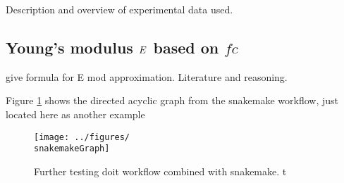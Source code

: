 Description and overview of experimental data used.

\subsection{Young's modulus \texorpdfstring{$E$}{E} based on \texorpdfstring{$fc$}{fc}}
give formula for E mod approximation.
Literature and reasoning.




Figure \ref{fig:snakemake_workflow} shows the directed acyclic graph from the snakemake workflow, just located here as another example
\begin{figure}[ht]%
	\centering
	\texttt{[image: ../figures/\\snakemakeGraph]}
	\caption{Further testing doit workflow combined with snakemake. t}\label{fig:snakemake_workflow}
\end{figure}